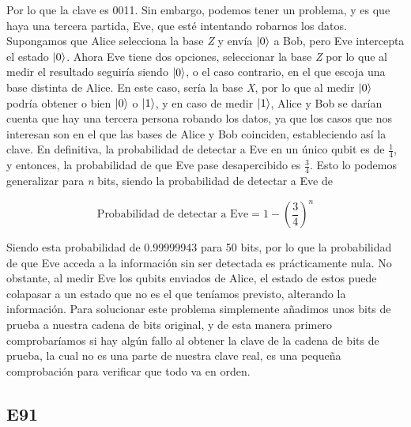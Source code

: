 \documentclass[12pt]{article}
\numberwithin{equation}{section} %
\begin{document}
    Por lo que la clave es 0011. Sin embargo, podemos tener un problema, y es que haya una tercera partida, Eve, que esté intentando robarnos los datos. Supongamos que Alice selecciona la base \textit{Z} y envía \( \ket{0} \) a Bob, pero Eve intercepta el estado \( \ket{0} \). Ahora Eve tiene dos opciones, seleccionar la base \textit{Z} por lo que al medir el resultado seguiría siendo \( \ket{0} \), o el caso contrario, en el que escoja una base distinta de Alice. En este caso, sería la base \textit{X}, por lo que al medir \( \ket{0} \) podría obtener o bien \( \ket{0} \) o \( \ket{1} \), y en caso de medir \( \ket{1} \), Alice y Bob se darían cuenta que hay una tercera persona robando los datos, ya que los casos que nos interesan son en el que las bases de Alice y Bob coinciden, estableciendo así la clave. En definitiva, la probabilidad de detectar a Eve en un único qubit es de \( \frac{1}{4} \), y entonces, la probabilidad de que Eve pase desapercibido es \( \frac{3}{4} \). Esto lo podemos generalizar para \textit{n} bits, siendo la probabilidad de detectar a Eve de

    \begin{equation*}
        \text{Probabilidad de detectar a Eve} = 1 - \left( \frac{3}{4} \right)^{n}
    \end{equation*}

    \vspace{2.5mm}

    Siendo esta probabilidad de 0.99999943 para 50 bits, por lo que la probabilidad de que Eve acceda a la información sin ser detectada es prácticamente nula. No obstante, al medir Eve los qubits enviados de Alice, el estado de estos puede colapasar a un estado que no es el que teníamos previsto, alterando la información. Para solucionar este problema simplemente añadimos unos bits de prueba a nuestra cadena de bits original, y de esta manera primero comprobaríamos si hay algún fallo al obtener la clave de la cadena de bits de prueba, la cual no es una parte de nuestra clave real, es una pequeña comprobación para verificar que todo va en orden.

    

    \vspace{5mm}



    \vspace{5mm}

    \subsection{E91}\label{subsection: e91}
\end{document}
